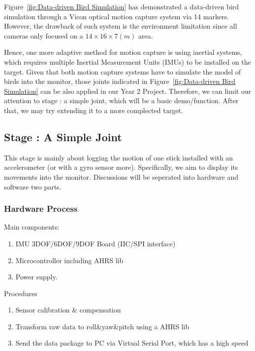 \documentclass[11pt, a4paper]{article}
\newcounter{mycounter}
\begin{document}
Figure~\ref{fig:Data-driven Bird Simulation} has demonstrated a data-driven bird simulation through a Vicon optical motion capture system via 14 markers. However, the drawback of such system is the environment limitation since all cameras only focused on a $14\times16\times7(m)$ area.

Hence, one more adaptive method for motion capture is using inertial systems, which requires multiple Inertial Measurement Units (IMUs) to be installed on the target. Given that both motion capture systems have to simulate the model of birds into the monitor, those joints indicated in Figure~\ref{fig:Data-driven Bird Simulation} can be also applied in our Year 2 Project. Therefore, we can limit our attention to stage \themycounter: a simple joint, which will be a basic demo/function. After that, we may try extending it to a more complected target.

\newpage
\subsection{Stage \themycounter: A Simple Joint}
This stage is mainly about logging the motion of one stick installed with an accelerometer (or with a gyro sensor more). Specifically, we aim to display its movements into the monitor. Discussions will be seperated into hardware and software two parts.

\subsubsection{Hardware Process}

Main components:
\begin{enumerate}
    \item IMU 3DOF/6DOF/9DOF Board (IIC/SPI interface)
    \item Microcontroller including AHRS lib
    \item Power supply.
\end{enumerate}

\noindent
Procedures
\begin{enumerate}
    \item Sensor calibration \& compensation
    \item Transform raw data to roll\&yaw\&pitch using a AHRS lib
    \item Send the data package to PC via Virtual Serial Port, which has a high speed
\end{enumerate}
\end{document}
